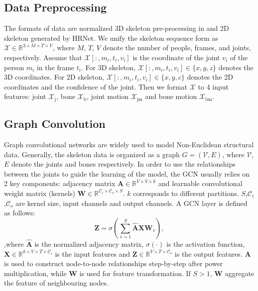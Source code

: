 \documentclass[10pt,twocolumn,letterpaper]{article}
\begin{document}
\subsection{Data Preprocessing}
\label{ssec:preprocessing}
The formats of data are normalized 3D skeleton pre-processing in \cite{chen2021channel} and 2D skeleton generated by HRNet\cite{duan2021revisiting}. We unify the skeleton sequence form as $\mathcal{X}\in {{\mathbb{R}}^{3\times M\times T\times V}}$, where $M$, $T$, $V$ denote the number of people, frames, and joints, respectively. Assume that $\mathcal{X}\left[ :,{{m}_{i}},{{t}_{i}},{{v}_{i}} \right]$ is the coordinate of the joint ${{v}_{i}}$ of the person ${{m}_{i}}$ in the frame ${{t}_{i}}$. For 3D skeleton, $\mathcal{X}\left[ :,{{m}_{i}},{{t}_{i}},{{v}_{i}} \right]\in \{x,y,z\}$ denotes the 3D coordinates. For 2D skeleton, $\mathcal{X}\left[ :,{{m}_{i}},{{t}_{i}},{{v}_{i}} \right]\in \{x,y,c\}$ denotes the 2D coordinates and the confidence of the joint. Then we format $\mathcal{X}$ to 4 input features: joint ${{\mathcal{X}}_{\text{j}}}$, bone ${{\mathcal{X}}_{\text{b}}}$, joint motion ${{\mathcal{X}}_{\text{jm}}}$ and bone motion ${{\mathcal{X}}_{\text{bm}}}$.

\subsection{Graph Convolution}
\label{ssec:graphconv}
Graph convolutional networks are widely used to model Non-Euclidean structural data. Generally, the skeleton data is organized as a graph $G=\left( \mathcal{V},E \right)$, where $\mathcal{V}$, $E$ denote the joints and bones respectively. In order to use the relationships between the joints to guide the learning of the model, the GCN usually relies on 2 key components: adjacency matrix $\mathbf{A}\in {{\mathbb{R}}^{V\times V\times k}}$ and learnable convolutional weight matrix (kernels) $\mathbf{W}\in {{\mathbb{R}}^{{{\mathcal{C}}_{i}}\times {{\mathcal{C}}_{o}}\times S}}$. $k$ corresponds to different partitions. $S$,${{\mathcal{C}}_{i}}$,${{\mathcal{C}}_{o}}$ are kernel size, input channels and output channels. A GCN layer is defined as follows:
\begin{equation}
  \mathbf{Z}=\sigma \left( \sum\limits_{s=1}^{S}{\mathbf{\hat{A}X}{{\mathbf{W}}_{s}}} \right),
  \label{quez}
\end{equation}
,where $\mathbf{\hat{A}}$ is the normalized adjacency matrix, $\sigma \left( \cdot  \right)$ is the activation function, $\mathbf{X}\in {{\mathbb{R}}^{k\times V\times T\times {{\mathcal{C}}_{i}}}}$ is the input features and $\mathbf{Z}\in {{\mathbb{R}}^{V\times T\times {{\mathcal{C}}_{o}}}}$ is the output features. $\mathbf{A}$ is used to construct node-to-node relationships step-by-step after power multiplication, while $\mathbf{W}$ is used for feature transformation. If $S>1$, $\mathbf{W}$ aggregate the feature of neighbouring nodes.
\end{document}
